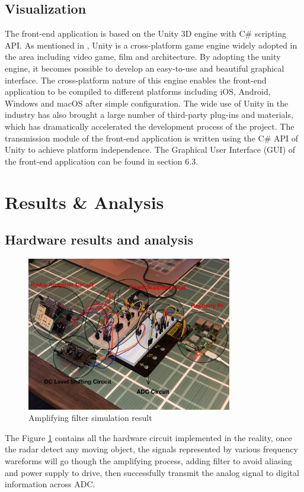 \subsection{Visualization}
The front-end application is based on the Unity 3D engine with C\# scripting API. As mentioned in \textcite{unity}, Unity is a cross-platform game engine widely adopted in the area including video game, film and architecture. By adopting the unity engine, it becomes possible to develop an easy-to-use and beautiful graphical interface. The cross-platform nature of this engine enables the front-end application to be compiled to different platforms including iOS, Android, Windows and macOS after simple configuration. The wide use of Unity in the industry has also brought a large number of third-party plug-ins and materials, which has dramatically accelerated the development process of the project. The transmission module of the front-end application is written using the C\# API of Unity to achieve platform independence. The Graphical User Interface (GUI) of the front-end application can be found in section 6.3.

\newpage
\section{Results \& Analysis}
\subsection{Hardware results and analysis}
\begin{figure}[H]
    \centering
    \includegraphics[width=0.8\textwidth]{figure/Hardware Appearance.jpg}
    \caption{Amplifying filter simulation result}
     \label{fig:hardware}
\end{figure}
The Figure \ref{fig:hardware} contains all the hardware circuit implemented in the reality, once the radar detect any moving object, the signals represented by various frequency wareforms will go though the amplifying process, adding filter to avoid aliasing and power supply to drive, then successfully transmit the analog signal to digital information across ADC.
